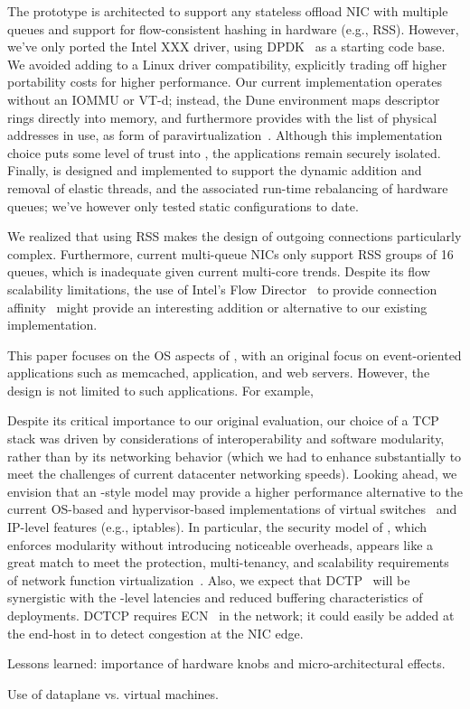  


 The \ix prototype is
architected to support any stateless offload NIC with multiple queues
and support for flow-consistent hashing in hardware (e.g., RSS).
However, we've only ported the Intel XXX driver, using
DPDK~\cite{intel:dpdk} as a starting code base.  We avoided adding to
\ix a Linux driver compatibility, explicitly trading off higher
portability costs for higher performance.  Our current implementation
operates without an IOMMU or VT-d; instead, the Dune environment maps
descriptor rings directly into \ix memory, and furthermore provides
\ix with the list of physical addresses in use, as form of
paravirtualization~\cite{DBLP:conf/sosp/BarhamDFHHHN03}.  Although
this implementation choice puts some level of trust into \ix, the
applications remain securely isolated.  Finally, \ix is designed and
implemented to support the dynamic addition and removal of elastic
threads, and the associated run-time rebalancing of hardware queues;
we've however only tested static configurations to date. 

 We realized that using RSS
makes the design of outgoing connections particularly complex.
Furthermore, current multi-queue NICs only support RSS groups of 16
queues, which is inadequate given current multi-core trends.  Despite
its flow scalability limitations, the use of Intel's Flow
Director~\cite{intel:82599} to provide connection
affinity~\cite{DBLP:conf/eurosys/PesterevSZM12} might provide an
interesting addition or alternative to our existing implementation.


 This paper focuses on the
OS aspects of \ix, with an original focus on event-oriented
applications such as memcached, application, and web servers.
However, the \ix design is not limited to such applications.  For
example, 

Despite its critical importance to our original evaluation, our choice
of a TCP stack was driven by considerations of interoperability and
software modularity, rather than by its networking behavior (which we
had to enhance substantially to meet the challenges of current
datacenter networking speeds).  Looking ahead, we envision that an
\ix-style model may provide a higher performance alternative to the
current OS-based and hypervisor-based implementations of virtual
switches~\cite{openvswitch} and IP-level features (e.g., iptables).
In particular, the security model of \ix, which enforces modularity
without introducing noticeable overheads, appears like a great match
to meet the protection, multi-tenancy, and scalability requirements of
network function virtualization~\cite{etsi:NFV}.  Also, we expect that
DCTP~\cite{DBLP:conf/sigcomm/AlizadehGMPPPSS10} will be synergistic
with the \microsecond-level latencies and reduced buffering
characteristics of \ix deployments.  DCTCP requires
ECN~\cite{ramakrishnan2001addition} in the network; it could easily be
added at the end-host in \ix to detect congestion at the NIC edge.




\todo Lessons learned: importance of hardware knobs and micro-architectural effects.


\todo Use of dataplane vs. virtual machines. 

